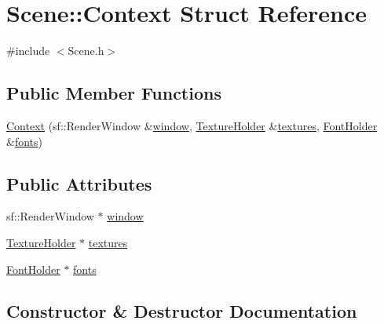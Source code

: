 \hypertarget{struct_scene_1_1_context}{}\section{Scene\+:\+:Context Struct Reference}
\label{struct_scene_1_1_context}


{\ttfamily \#include $<$Scene.\+h$>$}

\subsection*{Public Member Functions}
\begin{DoxyCompactItemize}
\item 
\hyperlink{struct_scene_1_1_context_ac08956521e8de60178029d2fe236819b}{Context} (sf\+::\+Render\+Window \&\hyperlink{struct_scene_1_1_context_a4ea0d87e64ed3888a01bfb67e7ac1b84}{window}, \hyperlink{_resource_identifiers_8h_a96220f9135333a0209f9367a28b7da13}{Texture\+Holder} \&\hyperlink{struct_scene_1_1_context_a6ec97ee92bfa4d09abc6edc9508d0050}{textures}, \hyperlink{_resource_identifiers_8h_ac2733d29d4a4d26a739742097fc51ede}{Font\+Holder} \&\hyperlink{struct_scene_1_1_context_ae8a09bf6b99a1081940f2f2d73db0272}{fonts})
\end{DoxyCompactItemize}
\subsection*{Public Attributes}
\begin{DoxyCompactItemize}
\item 
sf\+::\+Render\+Window $\ast$ \hyperlink{struct_scene_1_1_context_a4ea0d87e64ed3888a01bfb67e7ac1b84}{window}
\item 
\hyperlink{_resource_identifiers_8h_a96220f9135333a0209f9367a28b7da13}{Texture\+Holder} $\ast$ \hyperlink{struct_scene_1_1_context_a6ec97ee92bfa4d09abc6edc9508d0050}{textures}
\item 
\hyperlink{_resource_identifiers_8h_ac2733d29d4a4d26a739742097fc51ede}{Font\+Holder} $\ast$ \hyperlink{struct_scene_1_1_context_ae8a09bf6b99a1081940f2f2d73db0272}{fonts}
\end{DoxyCompactItemize}


\subsection{Constructor \& Destructor Documentation}
\mbox{\label{struct_scene_1_1_context_ac08956521e8de60178029d2fe236819b}} 
